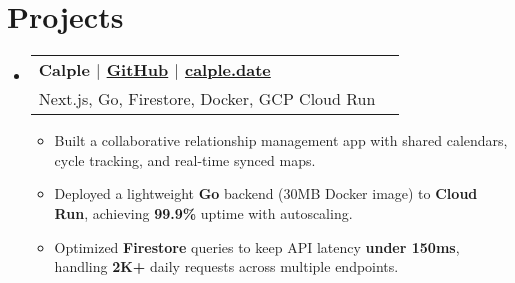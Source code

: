 \documentclass[letterpaper,11pt]{article}
\makeatletter
\newcommand{\resumeItem}[1]{
  \item{
    {#1}
  }
}
\newcommand{\resumeSubheading}[4]{
    \item
    \begin{tabular*}{0.985\textwidth}[t]{l@{\extracolsep{\fill}}r@{\hspace{-0.1in}}}
        {\textbf{#1}} & {#2} \\
        #3 &  #4 \\
    \end{tabular*}\vspace{-5pt}
}
\newcommand{\resumeSubHeadingListStart}{\begin{itemize}[leftmargin=0.00in, rightmargin=-0.2in, label={}]\vspace{3pt}}
\newcommand{\resumeSubHeadingListEnd}{\end{itemize}\vspace{-5pt}}
\newcommand{\resumeItemListStart}{\vspace{3pt}\begin{itemize}[leftmargin=0.15in, rightmargin=0.15in]}
\newcommand{\resumeItemListEnd}{\end{itemize}\vspace{-5pt}}
\makeatother
\begin{document}


\section{Projects}


\resumeSubHeadingListStart
\resumeSubheading
{\textbf{Calple} \textnormal{$|$ \href{https://github.com/juhun32/calple}{GitHub} $|$ \href{https://www.calple.date}{calple.date}}} {}
{{Next.js, Go, Firestore, Docker, GCP Cloud Run}}{}
\resumeItemListStart
\resumeItem{Built a collaborative relationship management app with shared calendars, cycle tracking, and real-time synced maps.}
\resumeItem{Deployed a lightweight \textbf{Go} backend (30MB Docker image) to \textbf{Cloud Run}, achieving \textbf{99.9\%} uptime with autoscaling.}
\resumeItem{Optimized \textbf{Firestore} queries to keep API latency \textbf{under 150ms}, handling \textbf{2K+} daily requests across multiple endpoints.}
\resumeItemListEnd
\resumeSubHeadingListEnd
\end{document}
